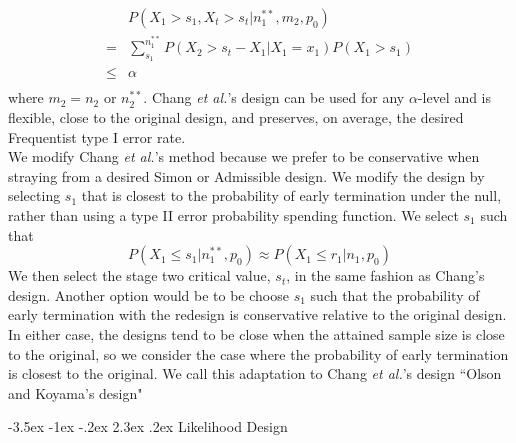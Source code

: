 \documentclass[12pt]{report}\usepackage[]{graphicx}\usepackage[]{color}
\makeatletter
\newlength{\li}\setlength{\li}{14.48pt}
\newlength{\di}\setlength{\di}{-3.5mm}
\renewcommand\section{ \@startsection {section}{1}{\z@}%
                                   {-3.5ex \@plus -1ex \@minus -.2ex}%
                                   {2.3ex \@plus.2ex}%
                                   {\centering\large\fontfamily{qcs}\selectfont}}
\makeatother
\begin{document}
\begin{equation*}
\begin{aligned}
& P(X_1 > s_1, X_t > s_t | n_1^{\ast\ast}, m_2, p_0) \\
= & \sum_{s_1}^{n_1^{\ast\ast}} P(X_2 > s_t - X_1 | X_1 = x_1) P(X_1 > s_1) \\
 \leq & \alpha \\
\end{aligned}
\end{equation*}
where $m_2 = n_2$ or $n_2^{\ast\ast}$. 
Chang \textit{et al.}'s design can be used for any $\alpha$-level and is flexible, close to the original design, and preserves, on average, the desired Frequentist type I error rate. \\
We modify Chang \textit{et al.}'s method because we prefer to be conservative when straying from a desired Simon or Admissible design. We modify the design by selecting $s_1$ that is closest to the probability of early termination under the null, rather than using a type II error probability spending function. We select $s_1$ such that $$P(X_1 \leq s_1 | n_1^{\ast\ast}, p_0) \approx P(X_1 \leq r_1 | n_1, p_0)$$ We then select the stage two critical value, $s_t$, in the same fashion as Chang's design. Another option would be to be choose $s_1$ such that the probability of early termination with the redesign is conservative relative to the original design. In either case, the designs tend to be close when the attained sample size is close to the original, so we consider the case where the probability of early termination is closest to the original. We call this adaptation to Chang \textit{et al.}'s design ``Olson and Koyama's design"  

\section{Likelihood Design}
\end{document}
